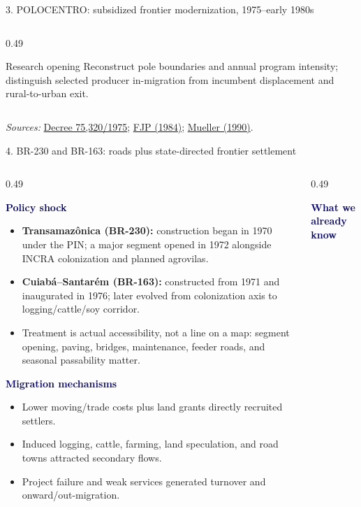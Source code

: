 \documentclass[aspectratio=169,10pt]{beamer}
\newcommand{\ShortSource}[1]{%
  \vfill\par\tiny\color{Muted}\textit{Sources:} #1}
\newcommand{\PolicyTag}[1]{%
  \colorbox{Sand}{\strut\textcolor{Navy}{\textbf{#1}}}}
\begin{document}
\begin{frame}{3. POLOCENTRO: subsidized frontier modernization, 1975--early 1980s}
\begin{columns}[T,onlytextwidth]
\begin{column}{0.49\textwidth}
\begin{block}{Research opening}
    Reconstruct pole boundaries and annual program intensity; distinguish selected producer in-migration from incumbent displacement and rural-to-urban exit.
  \end{block}
\end{column}
\end{columns}
\ShortSource{\href{https://www2.camara.leg.br/legin/fed/decret/1970-1979/decreto-75320-29-janeiro-1975-423871-publicacaooriginal-1-pe.html}{Decree 75,320/1975}; \href{https://www.bibliotecadigital.mg.gov.br/consulta/consultaDetalheDocumento.php?iCodDocumento=55206}{FJP (1984)}; \href{https://repositorio.ipea.gov.br/bitstream/11058/14764/1/ppp_n3_completo.pdf}{Mueller (1990)}.}
\end{frame}

\begin{frame}{4. BR-230 and BR-163: roads plus state-directed frontier settlement}
\small
\begin{columns}[T,onlytextwidth]
\begin{column}{0.49\textwidth}
  \PolicyTag{Policy shock}
  \begin{itemize}\setlength\itemsep{0.28em}
    \item \textbf{Transamazônica (BR-230):} construction began in 1970 under the PIN; a major segment opened in 1972 alongside INCRA colonization and planned agrovilas.
    \item \textbf{Cuiabá--Santarém (BR-163):} constructed from 1971 and inaugurated in 1976; later evolved from colonization axis to logging/cattle/soy corridor.
    \item Treatment is actual accessibility, not a line on a map: segment opening, paving, bridges, maintenance, feeder roads, and seasonal passability matter.
  \end{itemize}
  \vspace{0.2em}
  \PolicyTag{Migration mechanisms}
  \begin{itemize}\setlength\itemsep{0.25em}
    \item Lower moving/trade costs plus land grants directly recruited settlers.
    \item Induced logging, cattle, farming, land speculation, and road towns attracted secondary flows.
    \item Project failure and weak services generated turnover and onward/out-migration.
  \end{itemize}
\end{column}
\begin{column}{0.49\textwidth}
  \PolicyTag{What we already know}

\end{column}
\end{columns}
\end{frame}
\end{document}
